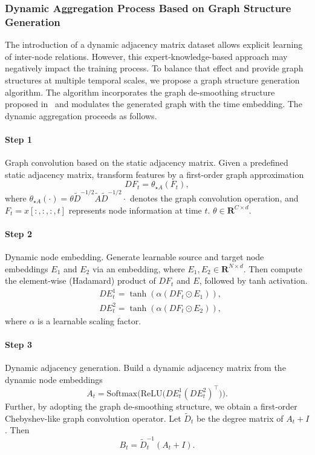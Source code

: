 \documentclass[preprint,12pt,authoryear]{elsarticle}
\begin{document}
\subsubsection{Dynamic Aggregation Process Based on Graph Structure Generation}

The introduction of a dynamic adjacency matrix dataset allows explicit learning of inter-node relations. However, this expert-knowledge-based approach may negatively impact the training process. To balance that effect and provide graph structures at multiple temporal scales, we propose a graph structure generation algorithm. The algorithm incorporates the graph de-smoothing structure proposed in~\cite{wu2020connecting} and modulates the generated graph with the time embedding. The dynamic aggregation proceeds as follows.

\paragraph{Step 1} Graph convolution based on the static adjacency matrix. Given a predefined static adjacency matrix, transform features by a first-order graph approximation
\begin{equation}
DF_t = \theta_{\star A}(F_t),
\end{equation}
where $\theta_{\star A}(\cdot) = \theta\tilde{D}^{-1/2} \tilde{A} \tilde{D}^{-1/2}\cdot$ denotes the graph convolution operation, and $F_t=x[:,:,:,t]$ represents node information at time $t$. $\theta\in \mathbf{R}^{C\times d}$.

\paragraph{Step 2} Dynamic node embedding. Generate learnable source and target node embeddings $E_1$ and $E_2$ via an embedding, where $E_1,E_2\in\mathbf{R}^{N\times d}$. Then compute the element-wise (Hadamard) product of $DF_t$ and $E$, followed by tanh activation.
\begin{align}
& DE_t^1=\tanh(\alpha(DF_t\odot E_1)),\\
& DE_t^2=\tanh(\alpha(DF_t\odot E_2)),
\end{align}
where $\alpha$ is a learnable scaling factor.

\paragraph{Step 3} Dynamic adjacency generation. Build a dynamic adjacency matrix from the dynamic node embeddings
\begin{equation}
A_t = \mathrm{Softmax}\bigl(\mathrm{ReLU}\bigl(DE_t^1 (DE_t^2)^\top\bigr)\bigr).
\end{equation}
Further, by adopting the graph de-smoothing structure, we obtain a first-order Chebyshev-like graph convolution operator. Let $\tilde{D}_t$ be the degree matrix of $A_t+I$. Then
\begin{equation}
B_t = \tilde{D}_t^{-1}(A_t+I).
\end{equation}
\end{document}

